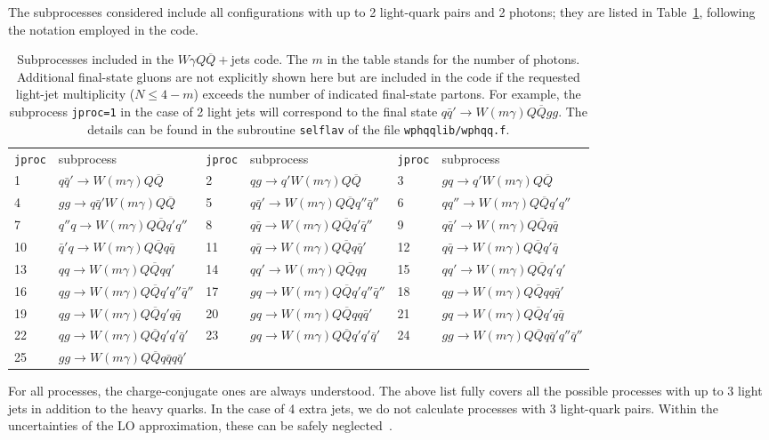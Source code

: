 \documentclass[paper]{JHEP3}
\newcommand{\ccaption}[2]{
    \begin{center}
    \parbox{0.85\textwidth}{
      \caption[#1]{\small{{#2}}}
      }
    \end{center}
    }
\def    \qbar   {\bar{q}}
\def    \Qbar   {\overline{Q}}
\begin{document}
 The subprocesses considered include all configurations
with up to 2 light-quark pairs and 2 photons; they are listed in
Table~\ref{tab:wphqq}, following the notation employed in the
code. 
\begin{table}
\begin{center}
\begin{tabular}{ll|ll|ll}
{\tt jproc} & subprocess & {\tt jproc} & subprocess & {\tt jproc} &
subprocess \\ 
1 &  $q\qbar' \to W(m\gamma) Q\Qbar$ 
&2 &  $q g \to q' W(m\gamma) Q\Qbar$ 
&3 &  $g q \to q' W(m\gamma) Q\Qbar$ 
\\
4 &  $gg \to q \qbar' W(m\gamma) Q\Qbar$ 
&5 &  $q\qbar' \to W(m\gamma) Q \Qbar q'' \qbar'' $ 
&6 &  $qq'' \to W(m\gamma) Q \Qbar q' q'' $ 
\\
7 &  $q'' q \to W(m\gamma) Q \Qbar q' q'' $ 
&8 &  $q\qbar \to W(m\gamma) Q \Qbar q' \qbar'' $ 
&9 &  $q\qbar' \to W(m\gamma) Q \Qbar q \qbar $ 
\\
10 &  $\qbar' q\to W(m\gamma) Q \Qbar q \qbar $ 
&11 &  $q\qbar \to W(m\gamma) Q \Qbar q \qbar' $ 
&12 &  $q\qbar \to W(m\gamma) Q \Qbar q' \qbar $ 
\\
13 &  $q q \to W(m\gamma) Q \Qbar q q' $ 
&14 &  $q q' \to W(m\gamma) Q \Qbar q q $ 
&15 &  $q q' \to W(m\gamma) Q \Qbar q' q' $ 
\\
16 &  $q g \to W(m\gamma) Q \Qbar q' q''\qbar'' $ 
&17 &  $g q \to W(m\gamma) Q \Qbar q' q''\qbar'' $ 
&18 &  $q g \to W(m\gamma) Q \Qbar q q \qbar' $ 
\\
19 &  $q g \to W(m\gamma) Q \Qbar q' q \qbar $ 
&20 &  $g q \to W(m\gamma) Q \Qbar q q \qbar' $ 
&21 &  $g q \to W(m\gamma) Q \Qbar q' q \qbar $ 
\\
22 &  $q g \to W(m\gamma) Q \Qbar q' q' \qbar' $ 
&23 &  $g q \to W(m\gamma) Q \Qbar q' q' \qbar' $ 
&24 &  $g g \to W(m\gamma) Q \Qbar q \qbar' q'' \qbar'' $ 
\\
25 &  $g g \to W(m\gamma) Q \Qbar q \qbar q \qbar' $ 
& &
& &
\end{tabular}
\ccaption{}{\label{tab:wphqq} Subprocesses included in the 
  $W\gamma Q\Qbar+$jets
  code. The $m$ in the table stands for the number of photons.
  Additional final-state gluons are not explicitly 
  shown here but are included in the code if the requested light-jet
  multiplicity ($N\le 4-m$) exceeds the number of 
  indicated final-state partons.
  For example, the subprocess {\tt jproc=1} in the case of 2 light jets
  will correspond to the final state  $q\qbar' \to W(m\gamma) Q\Qbar g g$.
  The details can be found in the subroutine {\tt selflav} of
  the file {\tt wphqqlib/wphqq.f}.}
\end{center}
\end{table}
For all processes, the charge-conjugate ones are always understood.
The above list fully covers all the possible processes with up to 3
light jets in addition to the heavy quarks. In the case of 4 extra
jets, we do not calculate processes with 3 light-quark pairs. Within
the uncertainties of the LO approximation, these can be safely
neglected~\cite{Berends:1991ax}.
\end{document}
